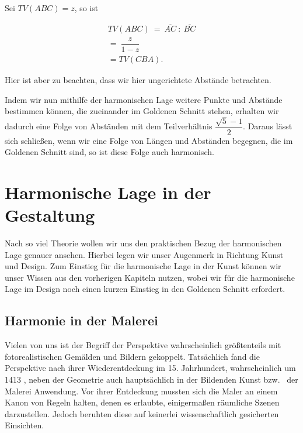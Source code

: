 \documentclass[12pt,a4paper]{article}
\begin{document}
Sei $TV(A B C) = z$, so ist

\begin{equation*}
\begin{split}
TV(A B C)~=~\overline{A C}~:~\overline{B C}\\
=~\dfrac{z}{1-z}~~~~~~\\
=TV(C B A).
\end{split}
\end{equation*}

Hier ist aber zu beachten, dass wir hier ungerichtete Abstände betrachten.

Indem wir nun mithilfe der harmonischen Lage weitere Punkte und Abstände bestimmen können, die zueinander im Goldenen Schnitt stehen, erhalten wir dadurch eine Folge von Abständen mit dem Teilverhältnis $\dfrac{\sqrt{5}-1}{2}$. Daraus lässt sich schließen, wenn wir eine Folge von Längen und Abständen begegnen, die im Goldenen Schnitt sind, so ist diese Folge auch harmonisch.


\newpage
\section{Harmonische Lage in der Gestaltung}

Nach so viel Theorie wollen wir uns den praktischen Bezug der harmonischen Lage genauer ansehen. Hierbei legen wir unser Augenmerk in Richtung Kunst und Design. Zum Einstieg für die harmonische Lage in der Kunst können wir unser Wissen aus den vorherigen Kapiteln nutzen, wobei wir für die harmonische Lage im Design noch einen kurzen Einstieg in den Goldenen Schnitt erfordert.

\subsection{Harmonie in der Malerei}
\label{subsec:harmMalerei}

Vielen von uns ist der Begriff der Perspektive wahrscheinlich größtenteils mit fotorealistischen Gemälden und Bildern gekoppelt. Tatsächlich fand die Perspektive nach ihrer Wiederentdeckung im 15. Jahrhundert, wahrscheinlich um 1413 \citep[S.~27]{perspektive}, neben der Geometrie auch hauptsächlich in der Bildenden Kunst bzw.~ der Malerei Anwendung. Vor ihrer Entdeckung mussten sich die Maler an einem Kanon von Regeln halten, denen es erlaubte, einigermaßen räumliche Szenen darzustellen. Jedoch beruhten diese auf keinerlei wissenschaftlich gesicherten Einsichten.
\end{document}
